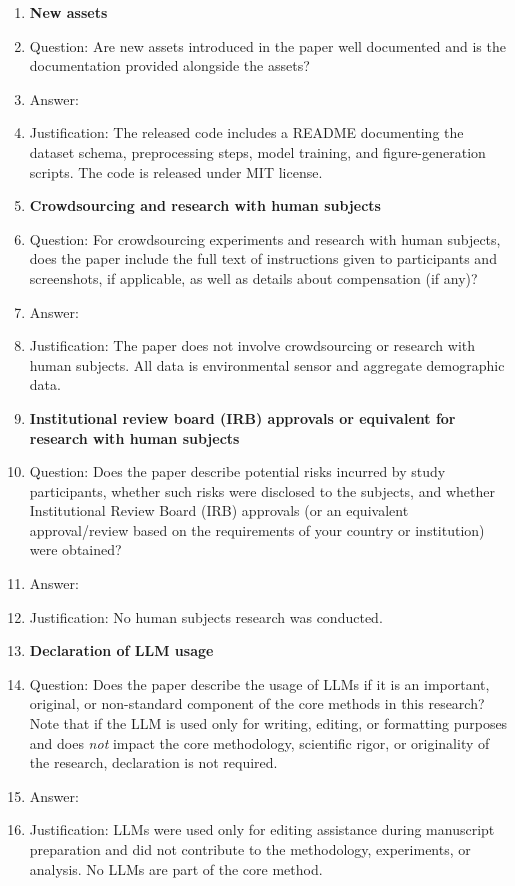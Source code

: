 \begin{enumerate}
\item {\bf New assets}
    \item[] Question: Are new assets introduced in the paper well documented and is the documentation provided alongside the assets?
    \item[] Answer: \answerYes{}
    \item[] Justification: The released code includes a README documenting the dataset schema, preprocessing steps, model training, and figure-generation scripts. The code is released under MIT license.

\item {\bf Crowdsourcing and research with human subjects}
    \item[] Question: For crowdsourcing experiments and research with human subjects, does the paper include the full text of instructions given to participants and screenshots, if applicable, as well as details about compensation (if any)?
    \item[] Answer: \answerNA{}
    \item[] Justification: The paper does not involve crowdsourcing or research with human subjects. All data is environmental sensor and aggregate demographic data.

\item {\bf Institutional review board (IRB) approvals or equivalent for research with human subjects}
    \item[] Question: Does the paper describe potential risks incurred by study participants, whether such risks were disclosed to the subjects, and whether Institutional Review Board (IRB) approvals (or an equivalent approval/review based on the requirements of your country or institution) were obtained?
    \item[] Answer: \answerNA{}
    \item[] Justification: No human subjects research was conducted.

\item {\bf Declaration of LLM usage}
    \item[] Question: Does the paper describe the usage of LLMs if it is an important, original, or non-standard component of the core methods in this research? Note that if the LLM is used only for writing, editing, or formatting purposes and does \emph{not} impact the core methodology, scientific rigor, or originality of the research, declaration is not required.
    \item[] Answer: \answerNA{}
    \item[] Justification: LLMs were used only for editing assistance during manuscript preparation and did not contribute to the methodology, experiments, or analysis. No LLMs are part of the core method.

\end{enumerate}
